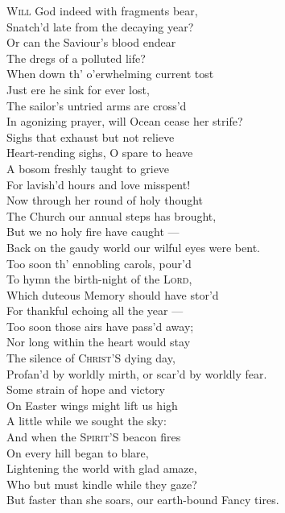 \textsc{Will} God indeed with fragments bear, \\
 Snatch’d late from the decaying year? \\
 Or can the Saviour’s blood endear \\
 The dregs of a polluted life? \\
 When down th’ o’erwhelming current tost \\
 Just ere he sink for ever lost, \\
 The sailor’s untried arms are cross’d \\
 In agonizing prayer, will Ocean cease her strife? \\
  Sighs that exhaust but not relieve \\
 Heart-rending sighs, O spare to heave \\
 A bosom freshly taught to grieve \\
 For lavish’d hours and love misspent! \\
 Now through her round of holy thought \\
 The Church our annual steps has brought, \\
 But we no holy fire have caught — \\
 Back on the gaudy world our wilful eyes were bent. \\
  Too soon th’ ennobling carols, pour’d \\
 To hymn the birth-night of the \textsc{Lord}, \\
 Which duteous Memory should have stor’d \\
 For thankful echoing all the year — \\
 Too soon those airs have pass’d away; \\
 Nor long within the heart would stay \\
 The silence of \textsc{Christ}’S dying day, \\
 Profan’d by worldly mirth, or scar’d by worldly fear. \\
  Some strain of hope and victory \\
 On Easter wings might lift us high \\
 A little while we sought the sky: \\
 And when the \textsc{Spirit}’S beacon fires \\
 On every hill began to blare, \\
 Lightening the world with glad amaze, \\
 Who but must kindle while they gaze? \\
 But faster than she soars, our earth-bound Fancy tires. \\
